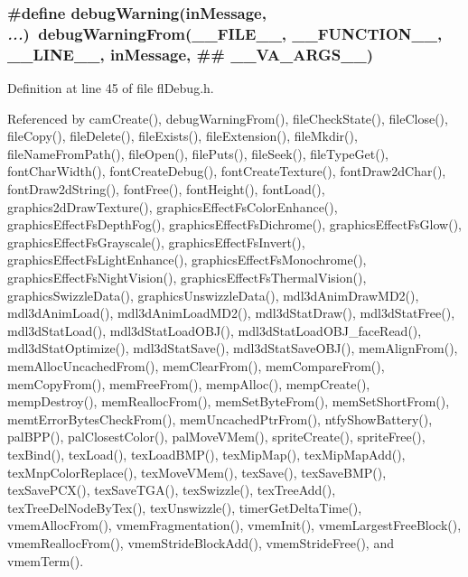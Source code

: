 \subsubsection{\setlength{\rightskip}{0pt plus 5cm}\#define debug\-Warning(in\-Message,  {\em ...})~debug\-Warning\-From(\_\-\_\-FILE\_\-\_\-, \_\-\_\-FUNCTION\_\-\_\-, \_\-\_\-LINE\_\-\_\-, in\-Message, \#\# \_\-\_\-VA\_\-ARGS\_\-\_\-)}\label{flDebug_8h_a122223db39f9f6ab0773adbf5de1a97}




Definition at line 45 of file fl\-Debug.h.

Referenced by cam\-Create(), debug\-Warning\-From(), file\-Check\-State(), file\-Close(), file\-Copy(), file\-Delete(), file\-Exists(), file\-Extension(), file\-Mkdir(), file\-Name\-From\-Path(), file\-Open(), file\-Puts(), file\-Seek(), file\-Type\-Get(), font\-Char\-Width(), font\-Create\-Debug(), font\-Create\-Texture(), font\-Draw2d\-Char(), font\-Draw2d\-String(), font\-Free(), font\-Height(), font\-Load(), graphics2d\-Draw\-Texture(), graphics\-Effect\-Fs\-Color\-Enhance(), graphics\-Effect\-Fs\-Depth\-Fog(), graphics\-Effect\-Fs\-Dichrome(), graphics\-Effect\-Fs\-Glow(), graphics\-Effect\-Fs\-Grayscale(), graphics\-Effect\-Fs\-Invert(), graphics\-Effect\-Fs\-Light\-Enhance(), graphics\-Effect\-Fs\-Monochrome(), graphics\-Effect\-Fs\-Night\-Vision(), graphics\-Effect\-Fs\-Thermal\-Vision(), graphics\-Swizzle\-Data(), graphics\-Unswizzle\-Data(), mdl3d\-Anim\-Draw\-MD2(), mdl3d\-Anim\-Load(), mdl3d\-Anim\-Load\-MD2(), mdl3d\-Stat\-Draw(), mdl3d\-Stat\-Free(), mdl3d\-Stat\-Load(), mdl3d\-Stat\-Load\-OBJ(), mdl3d\-Stat\-Load\-OBJ\_\-face\-Read(), mdl3d\-Stat\-Optimize(), mdl3d\-Stat\-Save(), mdl3d\-Stat\-Save\-OBJ(), mem\-Align\-From(), mem\-Alloc\-Uncached\-From(), mem\-Clear\-From(), mem\-Compare\-From(), mem\-Copy\-From(), mem\-Free\-From(), memp\-Alloc(), memp\-Create(), memp\-Destroy(), mem\-Realloc\-From(), mem\-Set\-Byte\-From(), mem\-Set\-Short\-From(), memt\-Error\-Bytes\-Check\-From(), mem\-Uncached\-Ptr\-From(), ntfy\-Show\-Battery(), pal\-BPP(), pal\-Closest\-Color(), pal\-Move\-VMem(), sprite\-Create(), sprite\-Free(), tex\-Bind(), tex\-Load(), tex\-Load\-BMP(), tex\-Mip\-Map(), tex\-Mip\-Map\-Add(), tex\-Mnp\-Color\-Replace(), tex\-Move\-VMem(), tex\-Save(), tex\-Save\-BMP(), tex\-Save\-PCX(), tex\-Save\-TGA(), tex\-Swizzle(), tex\-Tree\-Add(), tex\-Tree\-Del\-Node\-By\-Tex(), tex\-Unswizzle(), timer\-Get\-Delta\-Time(), vmem\-Alloc\-From(), vmem\-Fragmentation(), vmem\-Init(), vmem\-Largest\-Free\-Block(), vmem\-Realloc\-From(), vmem\-Stride\-Block\-Add(), vmem\-Stride\-Free(), and vmem\-Term().

